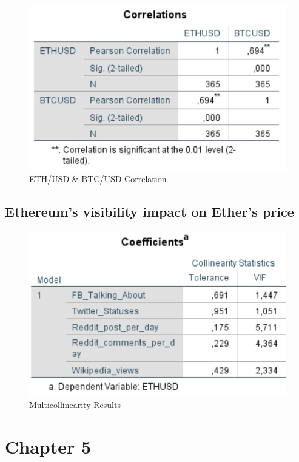 \documentclass[11pt]{report}
\begin{document}
\begin{figure}[!h]
\centering
\includegraphics[scale=0.8]{Chap5/CorrelationETHUSDBTCUSD}\medbreak
\caption{ETH/USD \& BTC/USD Correlation}
\label{Correlation}
\end{figure}

\subsection*{Ethereum's visibility impact on Ether's price}

\begin{figure}[!h]
\centering
\includegraphics[scale=0.7]{Chap5/VIF}
\medbreak
\caption{Multicollinearity Results}
\label{VIF}
\end{figure}

\clearpage
\section*{Chapter 5}
\end{document}
